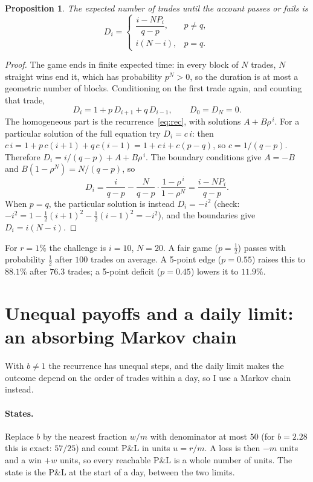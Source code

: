 \documentclass[11pt,a4paper]{article}
\newtheorem{proposition}{Proposition}
\begin{document}
\begin{proposition}\label{prop:duration}
The expected number of trades until the account passes or fails is
\[
  D_i =
  \begin{cases}
    \dfrac{i - N P_i}{q - p}, & p \neq q,\\[1.2em]
    i(N-i), & p = q.
  \end{cases}
\]
\end{proposition}

\begin{proof}
The game ends in finite expected time: in every block of $N$ trades, $N$ straight
wins end it, which has probability $p^N > 0$, so the duration is at most a geometric
number of blocks. Conditioning on the first trade again, and counting that trade,
\[
  D_i = 1 + p\,D_{i+1} + q\,D_{i-1}, \qquad D_0 = D_N = 0.
\]
The homogeneous part is the recurrence~\eqref{eq:rec}, with solutions $A + B\rho^{\,i}$.
For a particular solution of the full equation try $D_i = c\,i$: then
$c\,i = 1 + p\,c(i+1) + q\,c(i-1) = 1 + c\,i + c(p-q)$, so $c = 1/(q-p)$. Therefore
$D_i = i/(q-p) + A + B\rho^{\,i}$. The boundary conditions give $A = -B$ and
$B(1-\rho^N) = N/(q-p)$, so
\[
  D_i = \frac{i}{q-p} - \frac{N}{q-p}\cdot\frac{1-\rho^{\,i}}{1-\rho^N}
      = \frac{i - N P_i}{q-p}.
\]
When $p = q$, the particular solution is instead $D_i = -i^2$ (check:
$-i^2 = 1 - \tfrac12(i+1)^2 - \tfrac12(i-1)^2 = -i^2$), and the boundaries give
$D_i = i(N-i)$.
\end{proof}

For $r = 1\%$ the challenge is $i = 10$, $N = 20$. A fair game ($p = \tfrac12$) passes
with probability $\tfrac12$ after $100$ trades on average. A 5-point edge ($p = 0.55$)
raises this to $88.1\%$ after $76.3$ trades; a 5-point deficit ($p = 0.45$) lowers it to
$11.9\%$.

\section{Unequal payoffs and a daily limit: an absorbing Markov chain}

With $b \neq 1$ the recurrence has unequal steps, and the daily limit makes the outcome
depend on the order of trades within a day, so I use a Markov chain instead.

\paragraph{States.} Replace $b$ by the nearest fraction $w/m$ with denominator at most
$50$ (for $b = 2.28$ this is exact: $57/25$) and count P\&L in units $u = r/m$. A loss is
then $-m$ units and a win $+w$ units, so every reachable P\&L is a whole number of units.
The state is the P\&L at the start of a day, between the two limits.
\end{document}
